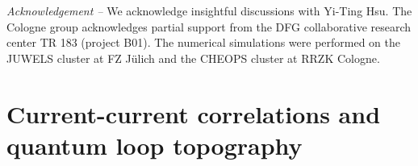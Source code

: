 \documentclass[amsmath,amssymb, aps, prl, twocolumn]{revtex4-1}
\begin{document}

\newpage

{\it Acknowledgement --} 
We acknowledge insightful discussions with Yi-Ting Hsu. 
The Cologne group acknowledges partial support from the DFG collaborative research center TR 183 (project B01). 
The numerical simulations were performed on the JUWELS cluster at FZ J\"ulich and the CHEOPS cluster at RRZK Cologne.




\newpage
\appendix

\section{Current-current correlations and quantum loop topography}
\end{document}
